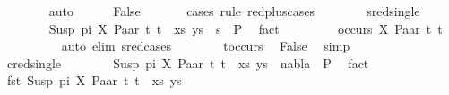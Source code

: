 \begin{isabellebody}
\ \ \ \ \ \ \isamarkupfalse%
\ auto\isanewline
\ \ \ \ \isamarkupfalse%
\ False\ \isanewline
\ \ \ \ \isamarkupfalse%
\ {\isacharparenleft}{\kern0pt}cases\ rule{\isacharcolon}{\kern0pt}\ red{\isacharunderscore}{\kern0pt}plus{\isachardot}{\kern0pt}cases{\isacharparenright}{\kern0pt}\isanewline
\ \ \ \ \ \ \isamarkupfalse%
\ sred{\isacharunderscore}{\kern0pt}single\isanewline
\ \ \ \ \ \ \isamarkupfalse%
\ {\isachardoublequoteopen}{\isacharparenleft}{\kern0pt}{\isacharparenleft}{\kern0pt}Susp\ pi\ X{\isacharcomma}{\kern0pt}\ Paar\ t{}\ t{}{\isacharparenright}{\kern0pt}\ {\isacharhash}{\kern0pt}\ xs{\isacharcomma}{\kern0pt}\ ys{\isacharparenright}{\kern0pt}\ {\isasymturnstile}\ s\ {\isasymleadsto}\ P{}{\isachardoublequoteclose}\ \isamarkupfalse%
\ fact\isanewline
\ \ \ \ \ \ \isamarkupfalse%
\ {\isachardoublequoteopen}{\isasymnot}\ occurs\ X\ {\isacharparenleft}{\kern0pt}Paar\ t{}\ t{}{\isacharparenright}{\kern0pt}{\isachardoublequoteclose}\ \isanewline
\ \ \ \ \ \ \ \ \isamarkupfalse%
\ {\isacharparenleft}{\kern0pt}auto\ elim{\isacharcolon}{\kern0pt}\ s{\isacharunderscore}{\kern0pt}red{\isachardot}{\kern0pt}cases{\isacharparenright}{\kern0pt}\isanewline
\ \ \ \ \ \ \isamarkupfalse%
\ t{\isacharunderscore}{\kern0pt}occurs\ \isamarkupfalse%
\ False\ \isamarkupfalse%
\ simp\isanewline
\ \ \ \ \isamarkupfalse%
\isanewline
\ \ \ \ \ \ \isamarkupfalse%
\ cred{\isacharunderscore}{\kern0pt}single\isanewline
\ \ \ \ \ \ \isamarkupfalse%
\ {\isachardoublequoteopen}{\isacharparenleft}{\kern0pt}{\isacharparenleft}{\kern0pt}Susp\ pi\ X{\isacharcomma}{\kern0pt}\ Paar\ t{}\ t{}{\isacharparenright}{\kern0pt}\ {\isacharhash}{\kern0pt}\ xs{\isacharcomma}{\kern0pt}\ ys{\isacharparenright}{\kern0pt}\ {\isasymturnstile}\ nabla\ {\isasymrightarrow}\ P{}{\isachardoublequoteclose}\ \isamarkupfalse%
\ fact\isanewline
\ \ \ \ \ \ \isamarkupfalse%
\ \isamarkupfalse%
\ {\isachardoublequoteopen}fst\ {\isacharparenleft}{\kern0pt}{\isacharparenleft}{\kern0pt}Susp\ pi\ X{\isacharcomma}{\kern0pt}\ Paar\ t{}\ t{}{\isacharparenright}{\kern0pt}\ {\isacharhash}{\kern0pt}\ xs{\isacharcomma}{\kern0pt}\ ys{\isacharparenright}{\kern0pt}\ {\isasymnoteq}\ {\isacharbrackleft}{\kern0pt}{\isacharbrackright}{\kern0pt}{\isachardoublequoteclose}\isanewline

\end{isabellebody}
